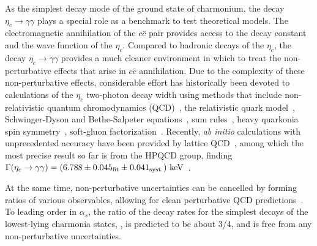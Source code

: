 \documentclass[twocolumn,showpacs,aps,prl]{revtex4-2}
\let\oldequation\equation
\let\oldendequation\endequation
\renewenvironment{equation}
{\linenomathNonumbers\oldequation}
{\oldendequation\endlinenomath}
\begin{document}
As the simplest decay mode of the ground state of charmonium, the decay $\eta_c \to \gamma \gamma$ plays a special role as a benchmark to test theoretical models. The electromagnetic annihilation of the $c\bar{c}$ pair provides access to the decay constant and the wave function of the $\eta_c$. Compared to hadronic decays of the $\eta_c$, the decay $\eta_c \to \gamma \gamma$ provides a much cleaner environment in which to treat the non-perturbative effects that arise in $c\bar{c}$ annihilation.  Due to the complexity of these non-perturbative effects, considerable effort has historically been devoted to calculations of the $\eta_c$ two-photon decay width using methods that include non-relativistic quantum chromodynamics (QCD)~\cite{Czarnecki:2001zc, Bodwin:2002cfe, Brambilla:2006ph, Guo:2011tz, Jia:2011ah, Feng:2017hlu, Brambilla:2018tyu, Yu:2019mce, Abreu:2022cco}, the relativistic quark model~\cite{Ackleh:1991dy, Munz:1996hb, Ebert:2003mu, Kim:2004rz}, Schwinger-Dyson and Bethe-Salpeter equations~\cite{Chao:1996bj, Chen:2016bpj, Higuera-Angulo:2024oui}, sum rules~\cite{PhysRevD.79.074026}, heavy quarkonia spin symmetry~\cite{Lansberg:2006dw}, soft-gluon factorization~\cite{Li:2019ncs}. Recently, \textit{ab initio} calculations with unprecedented accuracy have been provided by lattice QCD~\cite{Dudek:2006ut, CLQCD:2016ugl, CLQCD:2020njc, Liu:2020qfz, Zhang:2021xvl, Colquhoun:2023zbc, Meng:2021ecs, Colquhoun:2023zbc}, among which the most precise result so far is from the HPQCD group, finding $\Gamma(\eta_c \to \gamma \gamma) = (6.788 \pm 0.045_{\rm fit} \pm 0.041_{\rm syst.})~{\rm keV}$~\cite{Colquhoun:2023zbc}.

At the same time, non-perturbative uncertainties can be cancelled by forming ratios of various observables, allowing for clean perturbative QCD predictions~\cite{Czarnecki:2001zc}.  To leading order in $\alpha_{s}$, the ratio of the decay rates for the simplest decays of the lowest-lying charmonia states,
\begin{equation}
	\label{equ:R}
	 \equiv {},
\end{equation}
is predicted to be about 3/4, and is free from any non-perturbative uncertainties.
\end{document}
